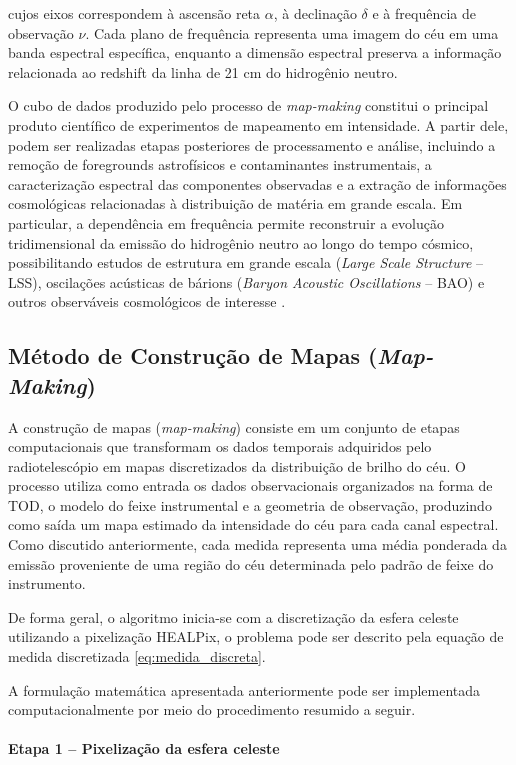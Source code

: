 cujos eixos correspondem à ascensão reta $\alpha$, à declinação $\delta$ e à frequência de observação $\nu$. Cada plano de frequência representa uma imagem do céu em uma banda espectral específica, enquanto a dimensão espectral preserva a informação relacionada ao redshift da linha de 21 cm do hidrogênio neutro.

O cubo de dados produzido pelo processo de \textit{map-making} constitui o principal produto científico de experimentos de mapeamento em intensidade. A partir dele, podem ser realizadas etapas posteriores de processamento e análise, incluindo a remoção de foregrounds astrofísicos e contaminantes instrumentais, a caracterização espectral das componentes observadas e a extração de informações cosmológicas relacionadas à distribuição de matéria em grande escala. Em particular, a dependência em frequência permite reconstruir a evolução tridimensional da emissão do hidrogênio neutro ao longo do tempo cósmico, possibilitando estudos de estrutura em grande escala (\textit{Large Scale Structure} -- LSS), oscilações acústicas de bárions (\textit{Baryon Acoustic Oscillations} -- BAO) e outros observáveis cosmológicos de interesse \cite{battye2012bingo}.

\subsection{Método de Construção de Mapas (\textit{Map-Making})}

A construção de mapas (\textit{map-making}) consiste em um conjunto de etapas computacionais que transformam os dados temporais adquiridos pelo radiotelescópio em mapas discretizados da distribuição de brilho do céu. O processo utiliza como entrada os dados observacionais organizados na forma de TOD, o modelo do feixe instrumental e a geometria de observação, produzindo como saída um mapa estimado da intensidade do céu para cada canal espectral. Como discutido anteriormente, cada medida representa uma média ponderada da emissão proveniente de uma região do céu determinada pelo padrão de feixe do instrumento.

De forma geral, o algoritmo inicia-se com a discretização da esfera celeste utilizando a pixelização HEALPix, o problema pode ser descrito pela equação de medida discretizada \eqref{eq:medida_discreta}.


A formulação matemática apresentada anteriormente pode ser implementada computacionalmente por meio do procedimento resumido a seguir.

\paragraph*{Etapa 1 -- Pixelização da esfera celeste}

